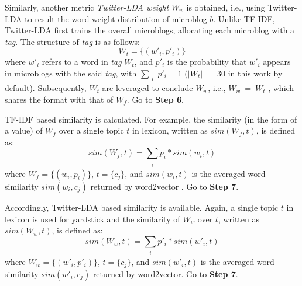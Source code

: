  Similarly, another metric \textit{Twitter-LDA weight} $W_w$ is obtained, i.e., using Twitter-LDA  %
\cite{IEEEexample:zhao2011comparing}
to result the word weight distribution of microblog $b$.
Unlike TF-IDF, Twitter-LDA first trains the overall microblogs, allocating each microblog with a \textit{tag}.
%
The structure of \textit{tag} is as follows:
\begin{equation}
\label{eq:tw-tag}
W_t = \{(w'_i, p'_i)\}
\end{equation}
where $w'_i$ refers to a word in \textit{tag} $W_t$, and $p'_i$ is the probability that $w'_i$ appears in microblogs with the said \textit{tag}, with $\sum_{\substack{i}} p'_i = 1$ ($|W_t|\ =\ 30$ in this work by default).
%
Subsequently, $W_t$ are leveraged to conclude $W_w$, i.e., $W_w\ =\ W_t$ , which shares the format with that of $W_f$.
Go to \textbf{Step 6}.

 TF-IDF based similarity is calculated.
For example, the similarity (in the form of a value) of $W_f$ over a single topic $t$ in lexicon, written as $sim(W_f, t)$, is defined as:
\begin{equation}
\label{eq:sim-tf1}
sim(W_f, t) = \sum_{\substack{i}} p_i*sim(w_i, t)
\end{equation}
where $W_f = \{(w_i, p_i)\}$, $t = \{c_j\}$, and $sim(w_i, t)$ is the averaged word similarity $sim(w_i, c_j)$ returned by word2vector \cite{IEEEexample:mikolov2013distributed}.
Go to \textbf{Step 7}.

\begin{comment}
:
\begin{equation}
\label{eq:sim-tf2}
sim(w_i, t) = \sum_{\substack{j}} sim(w_i, c_j)
\end{equation}
\end{comment}



 Accordingly, Twitter-LDA based similarity is available.
Again, a single topic $t$ in lexicon is used for yardstick and the similarity of $W_w$ over $t$, written as $sim(W_w, t)$, is defined as:
\begin{equation}
\label{eq:sim-tw1}
sim(W_w, t) = \sum_{\substack{i}} p'_i*sim(w'_i, t)
\end{equation}
where $W_w = \{(w'_i, p'_i)\}$, $t = \{c_j\}$, and $sim(w'_i, t)$ is the averaged word similarity $sim(w'_i, c_j)$ returned by word2vector.
Go to \textbf{Step 7}.

\begin{comment}
:
\begin{equation}
\label{eq:sim-tw2}
sim(w'_i, t) = \sum_{\substack{j}} sim(w'_i, c_j)
\end{equation}
\end{comment}



